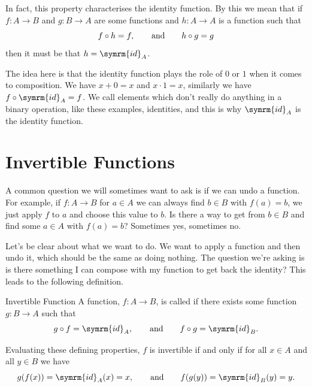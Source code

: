 \documentclass[fleqn]{LectureClass/LectureClass}
\newcommand{\id}{\symrm{id}}
\begin{document}
    In fact, this property characterises the identity function.
    By this we mean that if \(f \colon A \to B\) and \(g \colon B \to A\) are some functions and \(h \colon A \to A\) is a function such that
    \begin{equation}
        f \circ h = f, \qquad\text{and}\qquad h \circ g = g
    \end{equation}
    then it must be that \(h = \id_A\).
    
    The idea here is that the identity function plays the role of \(0\) or \(1\) when it comes to composition.
    We have \(x + 0 = x\) and \(x \cdot 1 = x\), similarly we have \(f \circ \id_A = f\).
    We call elements which don't really do anything in a binary operation, like these examples, identities, and this is why \(\id_A\) is the identity function.
    
    \section{Invertible Functions}
    A common question we will sometimes want to ask is if we can undo a function.
    For example, if \(f \colon A \to B\) for \(a \in A\) we can always find \(b \in B\) with \(f(a) = b\), we just apply \(f\) to \(a\) and choose this value to \(b\).
    Is there a way to get from \(b \in B\) and find some \(a \in A\) with \(f(a) = b\)?
    Sometimes yes, sometimes no.
    
    Let's be clear about what we want to do.
    We want to apply a function and then undo it, which should be the same as doing nothing.
    The question we're asking is is there something I can compose with my function to get back the identity?
    This leads to the following definition.
    
    \begin{dfn}{Invertible Function}{}
        A function, \(f \colon A \to B\), is called  if there exists some function \(g \colon B \to A\) such that
        \begin{equation}
            g \circ f = \id_A, \qqand f \circ g = \id_B.
        \end{equation}
    \end{dfn}
    
    Evaluating these defining properties, \(f\) is invertible if and only if for all \(x \in A\) and all \(y \in B\) we have
    \begin{equation}
        g(f(x)) = \id_A(x) = x, \qqand f(g(y)) = \id_B(y) = y.
    \end{equation}
    
\end{document}
